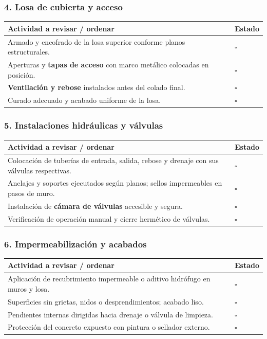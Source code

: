 \documentclass[12pt]{article}
\newcommand{\cbox}{\(\square\)} %
\begin{document}
	\subsubsection*{4. Losa de cubierta y acceso}
	\begin{tabularx}{\linewidth}{>{\raggedright\arraybackslash}p{0.93\linewidth} >{\centering\arraybackslash}m{0.07\linewidth}}
		\toprule
		\textbf{Actividad a revisar / ordenar} & \textbf{Estado}\\
		\midrule
		Armado y encofrado de la losa superior conforme planos estructurales. & \cbox \\
		Aperturas y \textbf{tapas de acceso} con marco metálico colocadas en posición. & \cbox \\
		\textbf{Ventilación y rebose} instalados antes del colado final. & \cbox \\
		Curado adecuado y acabado uniforme de la losa. & \cbox \\
		\bottomrule
	\end{tabularx}
	
	\subsubsection*{5. Instalaciones hidráulicas y válvulas}
	\begin{tabularx}{\linewidth}{>{\raggedright\arraybackslash}p{0.93\linewidth} >{\centering\arraybackslash}m{0.07\linewidth}}
		\toprule
		\textbf{Actividad a revisar / ordenar} & \textbf{Estado}\\
		\midrule
		Colocación de tuberías de entrada, salida, rebose y drenaje con sus válvulas respectivas. & \cbox \\
		Anclajes y soportes ejecutados según planos; sellos impermeables en pasos de muro. & \cbox \\
		Instalación de \textbf{cámara de válvulas} accesible y segura. & \cbox \\
		Verificación de operación manual y cierre hermético de válvulas. & \cbox \\
		\bottomrule
	\end{tabularx}
	
	\subsubsection*{6. Impermeabilización y acabados}
	\begin{tabularx}{\linewidth}{>{\raggedright\arraybackslash}p{0.93\linewidth} >{\centering\arraybackslash}m{0.07\linewidth}}
		\toprule
		\textbf{Actividad a revisar / ordenar} & \textbf{Estado}\\
		\midrule
		Aplicación de recubrimiento impermeable o aditivo hidrófugo en muros y losa. & \cbox \\
		Superficies sin grietas, nidos o desprendimientos; acabado liso. & \cbox \\
		Pendientes internas dirigidas hacia drenaje o válvula de limpieza. & \cbox \\
		Protección del concreto expuesto con pintura o sellador externo. & \cbox \\
		\bottomrule
	\end{tabularx}
	
\end{document}
